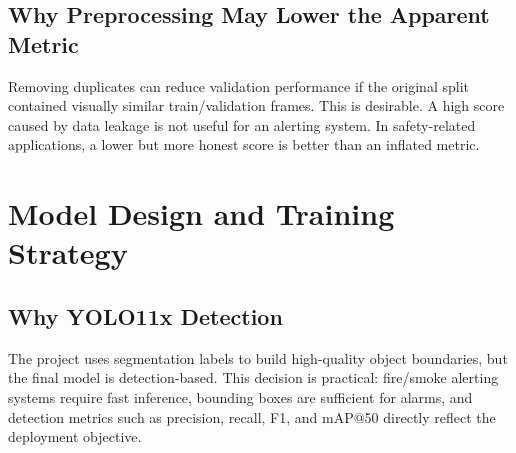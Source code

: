 \documentclass[12pt,a4paper]{report}
\begin{document}
\section{Why Preprocessing May Lower the Apparent Metric}
Removing duplicates can reduce validation performance if the original split contained visually similar train/validation frames. This is desirable. A high score caused by data leakage is not useful for an alerting system. In safety-related applications, a lower but more honest score is better than an inflated metric.

\chapter{Model Design and Training Strategy}
\section{Why YOLO11x Detection}
The project uses segmentation labels to build high-quality object boundaries, but the final model is detection-based. This decision is practical: fire/smoke alerting systems require fast inference, bounding boxes are sufficient for alarms, and detection metrics such as precision, recall, F1, and mAP@50 directly reflect the deployment objective.
\end{document}
